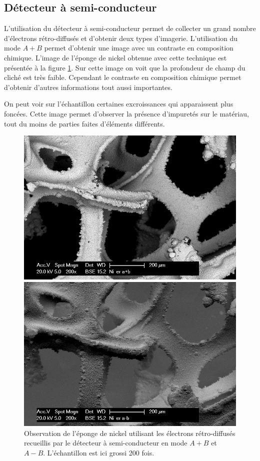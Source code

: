 \documentclass[a4paper,12pt]{article}
\begin{document}
\subsection{Détecteur à semi-conducteur}

L'utilisation du détecteur à semi-conducteur permet de collecter un grand nombre d'électrons rétro-diffusés
et d'obtenir deux types d'imagerie. L'utilisation du mode $A+B$ permet d'obtenir une image avec un contraste
en composition chimique. L'image de l'éponge de nickel obtenue avec cette technique est présentée à la figure
\ref{fig:ni_er_apb_amb}. Sur cette image on voit que la profondeur de champ du cliché est très faible. Cependant
le contraste en composition chimique permet d'obtenir d'autres informations tout aussi importantes.

On peut voir sur l'échantillon certaines excroissances qui apparaissent plus foncées. Cette image permet d'observer
la présence d'impuretés sur le matériau, tout du moins de parties faites d'éléments différents.


\begin{figure}
\begin{minipage}[c]{.55\linewidth}
\centering
\includegraphics[width = 0.7 \textwidth]{images/ni_er_apb.png}
\end{minipage}
\begin{minipage}[c]{.55\linewidth}
\includegraphics[width = 0.7 \textwidth]{images/ni_er_amb.png}
\end{minipage}
\caption{Observation de l'éponge de nickel utilisant les électrons rétro-diffusés recueillis par le détecteur à semi-conducteur en mode $A+B$ et $A-B$. L'échantillon est ici grossi 200 fois.}
\label{fig:ni_er_apb_amb}
\end{figure}
\end{document}
